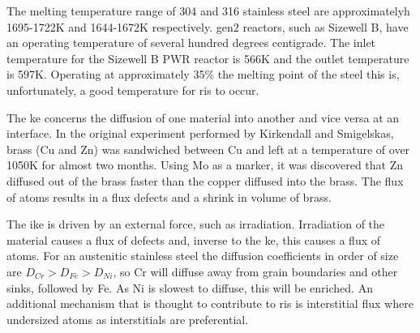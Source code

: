 The melting temperature range of 304 and 316 stainless steel are approximatelyh 1695-1722K and 1644-1672K respectively.  \acrshort{gen2} reactors, such as Sizewell B, have an operating temperature of several hundred degrees centigrade.  The inlet temperature for the Sizewell B PWR reactor is 566K\cite{sizewellbtemp} and the outlet temperature is 597K\cite{sizewellbtemp}.  Operating at approximately 35\% the melting point of the steel this is, unfortunately, a good temperature for \acrfull{ris} to occur.

The \acrfull{ke} concerns the diffusion of one material into another and vice versa at an interface.  In the original experiment performed by Kirkendall and Smigelskas, brass (\Gls{Cu} and Zn) was sandwiched between \Gls{Cu} and left at a temperature of over 1050K for almost two months.  Using Mo as a marker, it was discovered that Zn diffused out of the brass faster than the copper diffused into the brass.  The flux of atoms results in a flux defects and a shrink in volume of brass\cite{gswasike}.

The \acrfull{ike} is driven by an external force, such as irradiation.  Irradiation of the material causes a flux of defects and, inverse to the \acrshort{ke}, this causes a flux of atoms.  For an austenitic stainless steel the diffusion coefficients in order of size are $D_{Cr} > D_{Fe} > D_{Ni}$\cite{risfecrni}, so Cr will diffuse away from grain boundaries and other sinks, followed by Fe.  As Ni is slowest to diffuse, this will be enriched.  An additional mechanism that is thought to contribute to \acrshort{ris} is interstitial flux where undersized atoms as interstitials are preferential\cite{risfecrni}.

